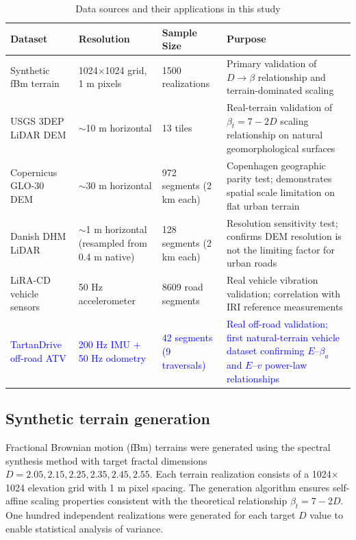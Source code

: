 \documentclass[11pt]{article}
\begin{document}
\begin{table}[h]
\centering
\caption{Data sources and their applications in this study}
\label{tab:datasources}
\small
\begin{tabular}{p{3cm}p{2.5cm}p{2cm}p{6cm}}
\hline
\textbf{Dataset} & \textbf{Resolution} & \textbf{Sample Size} & \textbf{Purpose} \\
\hline
Synthetic fBm terrain & 1024$\times$1024 grid, 1 m pixels & 1500 realizations & Primary validation of $D \rightarrow \beta$ relationship and terrain-dominated scaling \\
\hline
USGS 3DEP LiDAR DEM & $\sim$10 m horizontal & 13 tiles & Real-terrain validation of $\beta_t = 7-2D$ scaling relationship on natural geomorphological surfaces \\
\hline
Copernicus GLO-30 DEM & $\sim$30 m horizontal & 972 segments (2 km each) & Copenhagen geographic parity test; demonstrates spatial scale limitation on flat urban terrain \\
\hline
Danish DHM LiDAR & $\sim$1 m horizontal (resampled from 0.4 m native) & 128 segments (2 km each) & Resolution sensitivity test; confirms DEM resolution is not the limiting factor for urban roads \\
\hline
LiRA-CD vehicle sensors & 50 Hz accelerometer & 8609 road segments & Real vehicle vibration validation; correlation with IRI reference measurements \\
\hline
\textcolor{blue}{TartanDrive off-road ATV} & \textcolor{blue}{200 Hz IMU + 50 Hz odometry} & \textcolor{blue}{42 segments (9 traversals)} & \textcolor{blue}{Real off-road validation; first natural-terrain vehicle dataset confirming $E$--$\beta_a$ and $E$--$v$ power-law relationships} \\
\hline
\end{tabular}
\end{table}


\subsection*{Synthetic terrain generation}

Fractional Brownian motion (fBm) terrains were generated using the spectral synthesis method\cite{Musgrave2000} with target fractal dimensions $D = 2.05, 2.15, 2.25, 2.35, 2.45, 2.55$. Each terrain realization consists of a 1024$\times$1024 elevation grid with 1 m pixel spacing. The generation algorithm ensures self-affine scaling properties consistent with the theoretical relationship $\beta_t = 7-2D$. One hundred independent realizations were generated for each target $D$ value to enable statistical analysis of variance.
\end{document}
